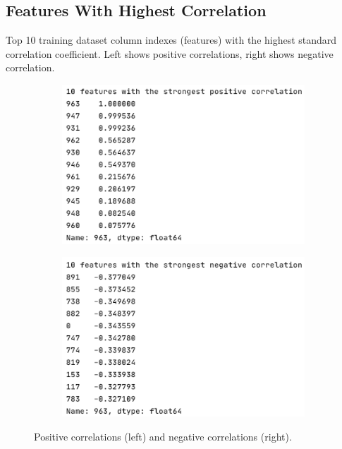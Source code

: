 \documentclass[letterpaper,12pt]{article}
\begin{document}
\begin{appendices}

\clearpage





\clearpage
\section{Features With Highest Correlation}
\label{sec:appendix-correlation}

Top 10 training dataset column indexes (features) with the highest standard correlation coefficient. Left shows positive correlations, right shows negative correlation.

\begin{figure}[h]
\centering
\begin{subfigure}{.49\textwidth}
  \centering
  \includegraphics[width=\textwidth]{report/figures/corr_pos.png}
  \label{fig:corr_pos}
\end{subfigure}%
\begin{subfigure}{.5\textwidth}
  \centering
  \includegraphics[width=\textwidth]{report/figures/corr_neg.png}
  \label{fig:corr_neg}
\end{subfigure}
\caption{\label{fig:correlation-results}Positive correlations (left) and negative correlations (right).}
\end{figure}


\end{appendices}
\end{document}
